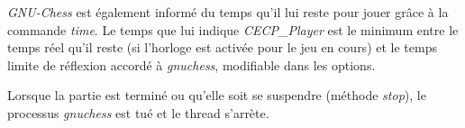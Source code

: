 \documentclass[11pt]{article}
\begin{document}
\-

\textit{GNU-Chess} est également informé du temps qu'il lui reste pour jouer grâce à la commande \textit{time}. Le temps que lui indique \textit{CECP\_Player} est le minimum entre le temps réel qu'il reste (si l'horloge est activée pour le jeu en cours) et le temps limite de réflexion accordé à \textit{gnuchess}, modifiable dans les options.

\-

Lorsque la partie est terminé ou qu'elle soit se suspendre (méthode \textit{stop}), le processus \textit{gnuchess} est tué et le thread
s'arrète.

\-
\end{document}
